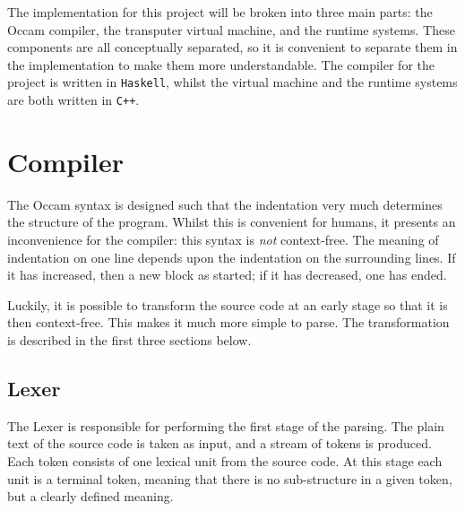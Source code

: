 The implementation for this project will be broken into three main parts: the
Occam compiler, the \gls{transputer} virtual machine, and the runtime systems.
These components are all conceptually separated, so it is convenient to separate
them in the implementation to make them more understandable. The compiler for
the project is written in \texttt{Haskell}, whilst the virtual machine and the
runtime systems are both written in \texttt{C++}.

\section{Compiler}

The Occam syntax is designed such that the indentation very much determines the
structure of the program. Whilst this is convenient for humans, it presents an
inconvenience for the compiler: this syntax is \textit{not} context-free. The
meaning of indentation on one line depends upon the indentation on the
surrounding lines. If it has increased, then a new block as started; if it has
decreased, one has ended.

Luckily, it is possible to transform the source code at an early stage so that
it is then context-free. This makes it much more simple to parse. The
transformation is described in the first three sections below.

\subsection{Lexer}

The Lexer is responsible for performing the first stage of the parsing. The
plain text of the source code is taken as input, and a stream of tokens is
produced. Each token consists of one lexical unit from the source code. At this
stage each unit is a terminal token, meaning that there is no sub-structure in
a given token, but a clearly defined meaning.

